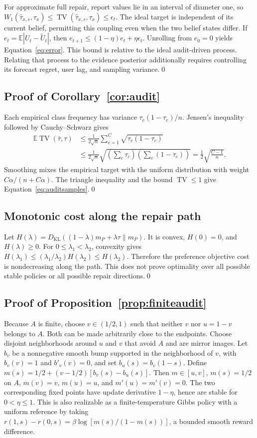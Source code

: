 \documentclass[10pt]{article}
\newcommand{\E}{\mathbb E}
\newcommand{\KL}{D_{\mathrm{KL}}}
\newcommand{\TV}{\operatorname{TV}}
\begin{document}
For approximate full repair, report values lie in an interval of diameter
one, so $W_1(\widehat\tau_{x,s},\tau_x)\le
\TV(\widehat\tau_{x,s},\tau_x)\le\epsilon_t$.
The ideal target is independent of its current belief, permitting this
coupling even when the two belief states differ. If
$e_t=\E|U_t-\widetilde U_t|$, then
$e_{t+1}\le(1-\eta)e_t+\eta\epsilon_t$.
Unrolling from $e_0=0$ yields Equation~\eqref{eq:error}. This bound is
relative to the ideal audit-driven process. Relating that process to the
evidence posterior additionally requires controlling its forecast regret,
user lag, and sampling variance.\qed

\subsection{Proof of Corollary~\ref{cor:audit}}
Each empirical class frequency has variance $\tau_c(1-\tau_c)/n$.
Jensen's inequality followed by Cauchy--Schwarz gives
\begin{align}
 \E\TV(\bar\tau,\tau)
 &\le\frac{1}{2\sqrt n}\sum_{c=1}^C\sqrt{\tau_c(1-\tau_c)}\\
 &\le\frac{1}{2\sqrt n}
       \sqrt{\left(\sum_c\tau_c\right)\left(\sum_c(1-\tau_c)\right)}
 =\frac12\sqrt{\frac{C-1}{n}}.
\end{align}
Smoothing mixes the empirical target with the uniform distribution with
weight $C\alpha/(n+C\alpha)$. The triangle inequality and the bound
$\TV\le1$ give Equation~\eqref{eq:auditsamples}.\qed

\subsection{Monotonic cost along the repair path}
Let $H(\lambda)=\KL((1-\lambda)m_P+\lambda\tau\|m_P)$.
It is convex, $H(0)=0$, and $H(\lambda)\ge0$. For
$0\le\lambda_1<\lambda_2$, convexity gives
$H(\lambda_1)\le(\lambda_1/\lambda_2)H(\lambda_2)\le H(\lambda_2)$.
Therefore the preference objective cost is nondecreasing along the path.
This does not prove optimality over all possible stable policies or all
possible repair directions.\qed

\subsection{Proof of Proposition~\ref{prop:finiteaudit}}
Because $A$ is finite, choose $v\in(1/2,1)$ such that neither $v$ nor
$u=1-v$ belongs to $A$. Both can be made arbitrarily close to the endpoints.
Choose disjoint neighborhoods around $u$ and $v$ that avoid $A$ and are
mirror images. Let $b_v$ be a nonnegative smooth bump supported in the
neighborhood of $v$, with $b_v(v)=1$ and $b'_v(v)=0$, and set
$b_u(s)=b_v(1-s)$. Define
$m(s)=1/2+(v-1/2)[b_v(s)-b_u(s)]$. Then $m\in[u,v]$,
$m(s)=1/2$ on $A$, $m(v)=v$, $m(u)=u$, and $m'(u)=m'(v)=0$.
The two corresponding fixed points have update derivative $1-\eta$, hence
are stable for $0<\eta\le1$. This is also realizable as a finite-temperature
Gibbs policy with a uniform reference by taking
$r(1,s)-r(0,s)=\beta\log[m(s)/(1-m(s))]$, a bounded smooth reward difference.
\end{document}

